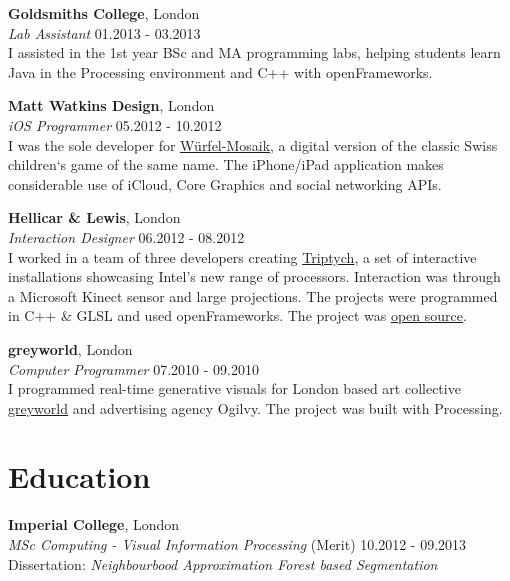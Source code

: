 \documentclass[margin,line,a4paper]{resume}
\begin{document}
\begin{resume}
\textbf{Goldsmiths College}, London \vspace{1mm}\\
\textsl{Lab Assistant} \hfill 01.2013 - 03.2013 \vspace{2mm} \\
I assisted in the 1st year BSc and MA programming labs, helping
students learn Java in the Processing environment and C++ with
openFrameworks.

\textbf{Matt Watkins Design}, London \vspace{1mm}\\
\textsl{iOS Programmer} \hfill 05.2012 - 10.2012 \vspace{2mm} \\
I was the sole developer for
\href{http://wurfelmosaik.com/}{W\"{u}rfel-Mosaik}, a digital version
of the classic Swiss children`s game of the same name. The iPhone/iPad
application makes considerable use of iCloud, Core Graphics and social
networking APIs.

\textbf{Hellicar \& Lewis}, London \vspace{1mm}\\
\textsl{Interaction Designer} \hfill 06.2012 - 08.2012 \vspace{2mm} \\
I worked in a team of three developers creating
\href{http://www.hellicarandlewis.com/2012/07/19/triptych}{Triptych},
a set of interactive installations showcasing Intel's new range of
processors. Interaction was through a Microsoft Kinect sensor and
large projections. The projects were programmed in C++ \& GLSL and
used openFrameworks. The project was
\href{https://github.com/HellicarAndLewis/Triptych}{open source}.

\textbf{greyworld}, London  \vspace{1mm}\\
\textsl{Computer Programmer} \hfill 07.2010 - 09.2010 \vspace{2mm} \\
I programmed real-time generative visuals for London
based art collective \href{http://greyworld.org}{greyworld} and
advertising agency Ogilvy. The project was built with Processing.


\section{\mysidestyle Education}

\textbf{Imperial College}, London \vspace{0.5mm}\\
\textsl{MSc Computing - Visual Information Processing} (Merit) \hfill 10.2012 - 09.2013 \vspace{2mm} \\
Dissertation: \emph{Neighbourbood Approximation Forest based Segmentation}


\end{resume}
\end{document}
